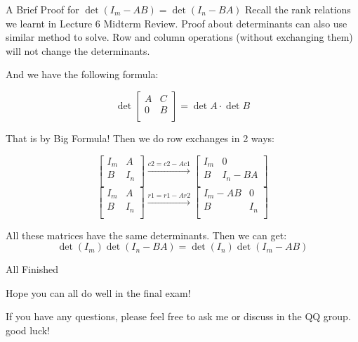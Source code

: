 \documentclass{beamer}
\begin{document}
\begin{frame}{A Brief Proof for $\det(I_m-AB)=\det(I_n-BA)$}
Recall the rank relations we learnt in Lecture 6 Midterm Review. Proof about determinants can also use similar method to solve. Row and column operations (without exchanging them) will not change the determinants.

\vspace{3pt}
And we have the following formula:

\begin{equation*}
    \det \left[ \begin{matrix}
        A&		C\\
        0&		B\\
    \end{matrix} \right] =\det A\cdot \det B
\end{equation*}

That is by Big Formula! Then we do row exchanges in 2 ways:

\begin{equation*}
    \left[ \begin{matrix}
        I_m&		A\\
        B&		I_n\\
    \end{matrix} \right] \xrightarrow{c2=c2-Ac1}\left[ \begin{matrix}
        I_m&		0\\
        B&		I_n-BA\\
    \end{matrix} \right]
\end{equation*}
\begin{equation*}
    \left[ \begin{matrix}
        I_m&		A\\
        B&		I_n\\
    \end{matrix} \right] \xrightarrow{r1=r1-Ar2}\left[ \begin{matrix}
        I_m-AB&		0\\
        B&		I_n\\
    \end{matrix} \right]
\end{equation*}

All these matrices have the same determinants. Then we can get:
\begin{equation*}
    \det \left( I_m \right) \det \left( I_n-BA \right) =\det \left( I_n \right) \det \left( I_m-AB \right)
\end{equation*}
\end{frame}

\begin{frame}{All Finished}
    \begin{LARGE}

    \begin{center}
        Hope you can all do well in the final exam!
    \end{center}
\end{LARGE}

\vspace{30pt}
If you have any questions, please feel free to ask me or discuss in the QQ group.  good luck!

\end{frame}
\end{document}
